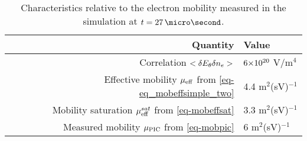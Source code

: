   \begin{table}[hbtp]
    \centering
    \caption{Characteristics relative to the electron mobility measured in the simulation at $t=27\,\micro\second$.}
    \label{tab-canonical_mobility}
    \begin{tabular}{@{} r l @{}} \toprule
    Quantity & Value \\ \midrule
    Correlation $<\delta E_{\theta} \delta n_e>$ & ${{6}{\times}10^{20}}$ V/m${^4}$ \\
    Effective mobility $\mu_{\mathrm{eff}}$ from \cref{eq-eq_mobeffsimple_two} & 4.4 m$^2$(sV)$^{-1}$ \\
    Mobility saturation $\mu_{\mathrm{eff}}^{sat}$ from \cref{eq-mobeffsat} & 3.3 m$^2$(sV)$^{-1}$ \\
    Measured mobility $\mu_{\mathrm{PIC}}$ from \cref{eq-mobpic} & 6 m$^2$(sV)$^{-1}$\\
    \bottomrule
    \end{tabular}
  \end{table}
  

  
  